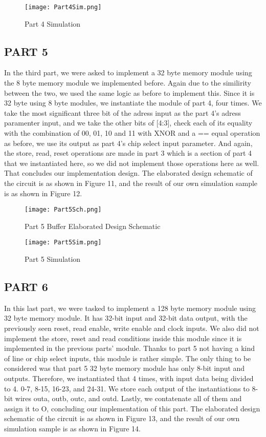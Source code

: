 \documentclass[pdftex,12pt,a4paper]{article}
\begin{document}
\begin{figure}[ht]
	\centering
	\texttt{[image: Part4Sim.png]}
	\caption{Part 4 Simulation}
	\label{fig1}
\end{figure}

\subsection{PART 5}
In the third part, we were asked to implement a 32 byte memory module using the 8 byte memory module we implemented before. Again due to the similirity between the two, we used the same logic as before to implement this. Since it is 32 byte using 8 byte modules, we instantiate the module of part 4, four times. We take the most significant three bit of the adress input as the part 4's adress paramenter input, and we take the other bits of [4:3], check each of its equality with the combination of 00, 01, 10 and 11 with XNOR and a == equal operation as before, we use its output as part 4's chip select input parameter. And again, the store, read, reset operations are made in part 3 which is a section of part 4 that we instantiated here, so we did not implement those operations here as well. That concludes our implementation design. The elaborated design schematic of the circuit is as shown in Figure 11, and the result of our own simulation sample is as shown in Figure 12. 

\begin{figure}[ht]
	\centering
	\texttt{[image: Part5Sch.png]}
	\caption{Part 5 Buffer Elaborated Design Schematic}
	\label{fig1}
\end{figure}

\begin{figure}[ht]
	\centering
	\texttt{[image: Part5Sim.png]}
	\caption{Part 5 Simulation}
	\label{fig1}
\end{figure}

\subsection{PART 6}
In this last part, we were tasked to implement a 128 byte memory module using 32 byte memory module. It has 32-bit input and 32-bit data output, with the previously seen reset, read enable, write enable and clock inputs. We also did not implement the store, reset and read conditions inside this module since it is implemented in the previous parts' module. Thanks to part 5 not having a kind of line or chip select inputs, this module is rather simple. The only thing to be considered was that part 5 32 byte memory module has only 8-bit input and outputs. Therefore, we instantiated that 4 times, with input data being divided to 4. 0-7, 8-15, 16-23, and 24-31. We store each output of the instantiations to 8-bit wires outa, outb, outc, and outd. Lastly, we contatenate all of them and assign it to O, concluding our implementation of this part. The elaborated design schematic of the circuit is as shown in Figure 13, and the result of our own simulation sample is as shown in Figure 14. 
\end{document}
